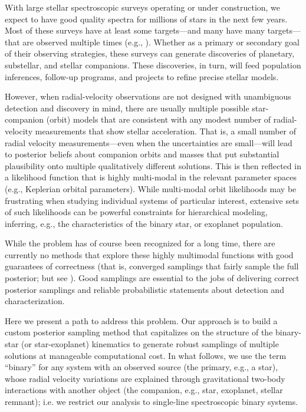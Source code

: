 \documentclass[manuscript, letterpaper]{aastex6}
\begin{document}
With large stellar spectroscopic surveys operating or under
construction, we expect to have good quality spectra for millions
of stars in the next few years.
Most of these surveys have at least some targets---and many have many
targets---that are observed multiple times (e.g., \citealt{Majewski:2015}).
Whether as a primary or secondary goal of their observing
strategies, these surveys can generate discoveries of planetary,
substellar, and stellar companions.
These discoveries, in turn, will feed population inferences, follow-up
programs, and projects to refine precise stellar models.

However, when radial-velocity observations are not designed with
unambiguous detection and discovery in mind, there are usually
multiple possible star-companion (orbit) models that are consistent with any
modest number of radial-velocity measurements that show stellar
acceleration.
That is, a small number of radial velocity measurements---even when the
uncertainties are small---will lead to posterior beliefs about companion
orbits and masses that put substantial plausibility onto multiple
qualitatively different solutions.
This is then reflected in a likelihood function that is highly multi-modal in
the relevant parameter spaces (e.g., Keplerian orbital parameters).
While multi-modal orbit likelihoods may be frustrating when studying individual
systems of particular interest, extensive sets of such likelihoods can
be powerful constraints for hierarchical modeling, inferring, e.g., the
characteristics of the binary star, or exoplanet population.

While the problem has of course been recognized for a long time, there
are currently no methods that explore these highly multimodal
functions with good guarantees of correctness (that is, converged
samplings that fairly sample the full posterior; but see
\citealt{Brewer:2015}).
Good samplings are essential to the jobs of
delivering correct posterior samplings and reliable probabilistic statements
about detection and characterization.

Here we present a path to address this problem.
Our approach is to build a custom posterior sampling method that capitalizes on
the structure of the binary-star (or star-exoplanet) kinematics to generate
robust samplings of multiple solutions at manageable computational cost.
In what follows, we use the term ``binary'' for any system with an observed
source (the primary, e.g., a star), whose radial velocity variations are
explained through gravitational two-body interactions with another object (the
companion, e.g., star, exoplanet, stellar remnant); i.e. we restrict our
analysis to single-line spectroscopic binary systems.
\end{document}
